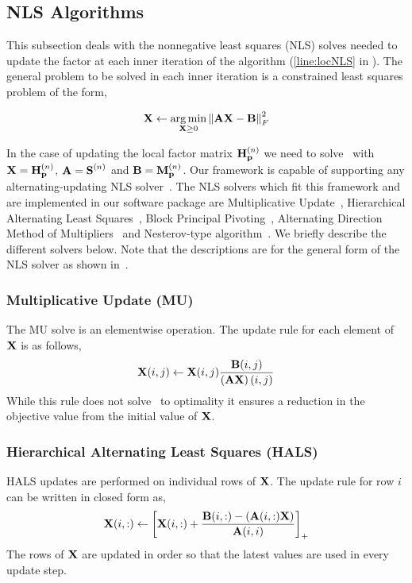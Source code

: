 \subsection{NLS Algorithms}
This subsection deals with the nonnegative least squares (NLS) solves needed to update the factor at each inner iteration of the algorithm (\cref{line:locNLS} in ). The general problem to be solved in each inner iteration is a constrained least squares problem of the form,

\begin{align}
\M{X} \leftarrow \underset{\M{X} \ge 0}{\argmin} \left\lVert \M{A}\M{X} -\M{B}\right\rVert^2_F
\label{eqn:nls}
\end{align}

In the case of updating the local factor matrix $\Mn{H}{n}_{\V{p}}$ we need to solve~ with $\M{X} = \Mn{H}{n}_{\V{p}}$, $\M{A} = \Mn{S}{n}$ and $\M{B} = \Mn{M}{n}_{\V{p}}$. Our framework is capable of supporting any alternating-updating NLS solver~\cite{KBP16}. The NLS solvers which fit this framework and are implemented in our software package are Multiplicative Update~\cite{LS99}, Hierarchical Alternating Least Squares~\cite{CP2009}, Block Principal Pivoting~\cite{KP2011}, Alternating Direction Method of Multipliers~\cite{HSL2016} and Nesterov-type algorithm~\cite{LKLHS2017}. We briefly describe the different solvers below. Note that the descriptions are for the general form of the NLS solver as shown in~.


\subsubsection{Multiplicative Update (MU)}
The MU solve is an elementwise operation. The update rule for each element of $\M{X}$ is as follows,
\begin{align}
\M{X}(i,j) \leftarrow \M{X}(i,j)\frac{\M{B}(i,j)}{\left(\M{A}\M{X}\right)(i,j)}
\end{align}
While this rule does not solve~ to optimality it ensures a reduction in the objective value from the initial value of $\M{X}$.

\subsubsection{Hierarchical Alternating Least Squares (HALS)}
HALS updates are performed on individual rows of $\M{X}$. The update rule for row $i$ can be written in closed form as,
\begin{align}
\M{X}(i,:) \leftarrow \left[ \M{X}(i,:) + \frac{\M{B}(i,:) - \left(\M{A}(i,:)\M{X}\right)}{\M{A}(i,i)} \right]_+
\end{align}
The rows of $\M{X}$ are updated in order so that the latest values are used in every update step.

